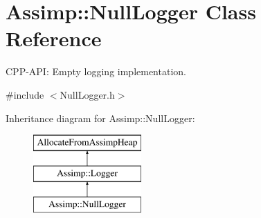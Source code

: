 \hypertarget{class_assimp_1_1_null_logger}{\section{Assimp\-:\-:Null\-Logger Class Reference}
\label{class_assimp_1_1_null_logger}
}


C\-P\-P-\/\-A\-P\-I\-: Empty logging implementation.  




{\ttfamily \#include $<$Null\-Logger.\-h$>$}

Inheritance diagram for Assimp\-:\-:Null\-Logger\-:\begin{figure}[H]
\begin{center}
\leavevmode
\includegraphics[height=3.000000cm]{class_assimp_1_1_null_logger}
\end{center}
\end{figure}
